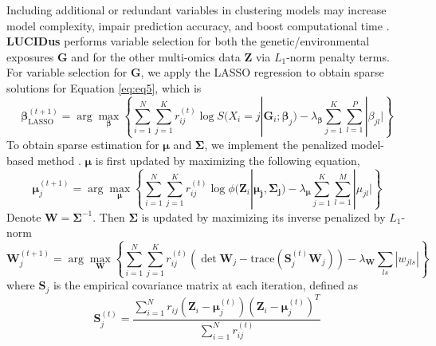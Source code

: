Including additional or redundant variables in clustering models may
increase model complexity, impair prediction accuracy, and boost
computational time \citep{fop2018variable}. \textbf{LUCIDus} performs variable
selection for both the genetic/environmental exposures
\(\boldsymbol{\mathbf{G}}\) and for the other multi-omics data
\(\boldsymbol{\mathbf{Z}}\) via \(L_1\)-norm penalty terms. For variable
selection for \(\boldsymbol{\mathbf{G}}\), we apply the LASSO regression
to obtain sparse solutions for Equation \eqref{eq:eq5}, which is
\[\boldsymbol{\mathbf{\beta}}_{\text{LASSO}}^{(t+1)} = \arg \max_{\boldsymbol{\mathbf{\beta}}} \left\{ \sum_{i = 1}^N \sum_{j = 1}^K r_{ij}^{(t)}\log S(X_i = j | \boldsymbol{\mathbf{G}}_i; \boldsymbol{\mathbf{\beta}}_j) - \lambda_{\boldsymbol{\mathbf{\beta}}}\sum_{j = 1}^K\sum_{l = 1}^P |\beta_{jl}| \right\}
     \label{eq14}   \label{eq:eq14}\]
To obtain sparse estimation for \(\boldsymbol{\mathbf{\mu}}\) and
\(\boldsymbol{\mathbf{\Sigma}}\), we implement the penalized model-based
method \citep{zhou2009penalized}. \(\boldsymbol{\mathbf{\mu}}\) is first
updated by maximizing the following equation,
\[\boldsymbol{\mathbf{\mu}}_j^{(t+1)} = \arg \max_{\boldsymbol{\mathbf{\mu}}} \left \{ \sum_{i = 1}^N \sum_{j = 1}^K r_{ij}^{(t)}\log \phi(\boldsymbol{\mathbf{Z}}_i| \boldsymbol{\mathbf{\mu_j}}, \boldsymbol{\mathbf{\Sigma_j}}) - \lambda_{\boldsymbol{\mathbf{\mu}}}\sum_{j = 1}^K\sum_{l = 1}^M |\mu_{jl}| \right \}
    \label{eq15}   \label{eq:eq15}\]
Denote \(\boldsymbol{\mathbf{W}} = \boldsymbol{\mathbf{\Sigma}}^{-1}\).
Then \(\boldsymbol{\mathbf{\Sigma}}\) is updated by maximizing its inverse
penalized by \(L_1\)-norm
\[\boldsymbol{\mathbf{W}}_j^{(t+1)} = \arg \max_{\boldsymbol{\mathbf{W}}} \left \{ \sum_{i = 1}^N \sum_{j = 1}^K r_{ij}^{(t)}\left( \det \boldsymbol{\mathbf{W}}_j - \text{trace}(\boldsymbol{\mathbf{S}}_j^{(t)} \boldsymbol{\mathbf{W}}_j) \right) - \lambda_{\boldsymbol{\mathbf{W}}}\sum_{ls}|w_{jls}| \right \}
    \label{eq16}   \label{eq:eq16}\]
where \(\boldsymbol{\mathbf{S}}_j\) is the empirical covariance matrix at
each iteration, defined as
\[\boldsymbol{\mathbf{S}}_j^{(t)} = \frac{\sum_{i=1}^N r_{ij}\left(\boldsymbol{\mathbf{Z}}_i - \boldsymbol{\mathbf{\mu}}_j^{(t)}\right)\left(\boldsymbol{\mathbf{Z}}_i - \boldsymbol{\mathbf{\mu}}_j^{(t)}\right)^T}{\sum_{i=1}^N r_{ij}^{(t)}}
    \label{eq17}   \label{eq:eq17}\]

